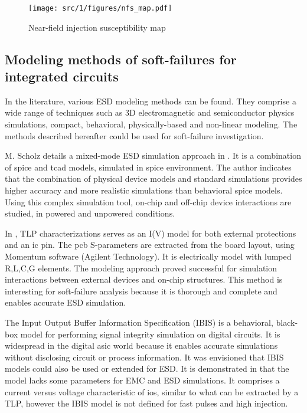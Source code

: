 \begin{figure}[!h]
  \centering
  \texttt{[image: src/1/figures/nfs\_map.pdf]}
  \caption{Near-field injection susceptibility map \cite{phd-monnereau}}
  \label{fig:near-field-scan-map}
\end{figure}


\subsection{Modeling methods of soft-failures for integrated circuits}

In the literature, various ESD modeling methods can be found.
They comprise a wide range of techniques such as 3D electromagnetic and semiconductor physics simulations, compact, behavioral, physically-based and non-linear modeling.
The methods described hereafter could be used for soft-failure investigation.

M. Scholz details a mixed-mode ESD simulation approach in \cite{mixedModeESDSims}.
It is a combination of \gls{spice} and \gls{tcad} models, simulated in \gls{spice} environment.
The author indicates that the combination of physical device models and standard simulations provides higher accuracy and more realistic simulations than behavioral \gls{spice} models.
Using this complex simulation tool, on-chip and off-chip device interactions are studied, in powered and unpowered conditions.

In \cite{usb2ESDProtection}, TLP characterizations serves as an I(V) model for both external protections and an \gls{ic} pin.
The \gls{pcb} S-parameters are extracted from the board layout, using Momentum software (Agilent Technology).
It is electrically model with lumped R,L,C,G elements.
The modeling approach proved successful for simulation interactions between external devices and on-chip structures.
This method is interesting for soft-failure analysis because it is thorough and complete and enables accurate ESD simulation.

The Input Output Buffer Information Specification (IBIS) \cite{ibis-spec} is a behavioral, black-box model for performing signal integrity simulation on digital circuits.
It is widespread in the digital \gls{asic} world because it enables accurate simulations without disclosing circuit or process information.
It was envisioned that IBIS models could also be used or extended for ESD.
It is demonstrated in \cite{ibisImprovementFabrice} that the model lacks some parameters for EMC and ESD simulations.
It comprises a current versus voltage characteristic of \gls{io}s, similar to what can be extracted by a TLP, however the IBIS model is not defined for fast pulses and high injection.


